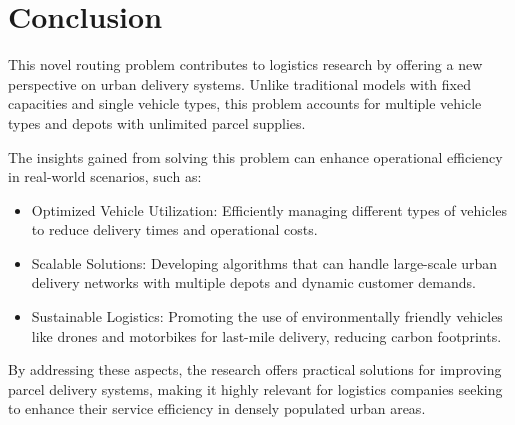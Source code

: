 \documentclass[twocolumn]{article}
\begin{document}
	
	\section{Conclusion}
	This novel routing problem contributes to logistics research by offering a new perspective on urban delivery systems. Unlike traditional models with fixed capacities and single vehicle types, this problem accounts for multiple vehicle types and depots with unlimited parcel supplies. 
	\par 
	The insights gained from solving this problem can enhance operational efficiency in real-world scenarios, such as:
	\begin{itemize}
		\item Optimized Vehicle Utilization: Efficiently managing different types of vehicles to reduce delivery times and operational costs.
		\item Scalable Solutions: Developing algorithms that can handle large-scale urban delivery networks with multiple depots and dynamic customer demands.
		\item Sustainable Logistics: Promoting the use of environmentally friendly vehicles like drones and motorbikes for last-mile delivery, reducing carbon footprints.
	\end{itemize}
	By addressing these aspects, the research offers practical solutions for improving parcel delivery systems, making it highly relevant for logistics companies seeking to enhance their service efficiency in densely populated urban areas.
	
\end{document}
